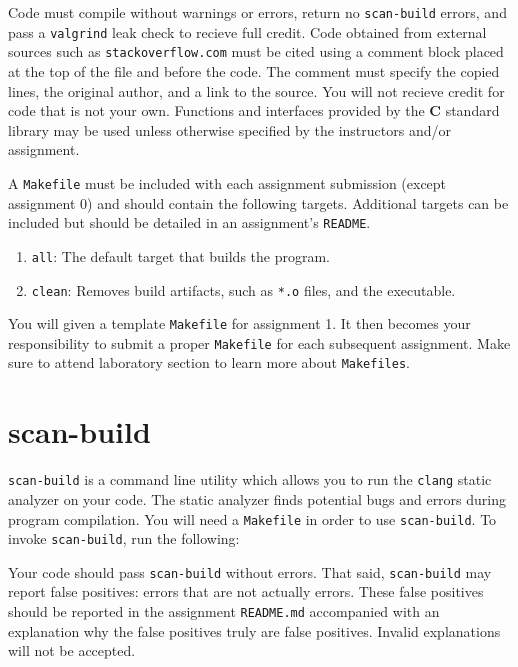 \documentclass[11pt]{article}
\begin{document}
\noindent Code must compile without warnings or errors, return no
\texttt{scan-build} errors, and pass a \texttt{valgrind} leak check to
recieve full credit. Code obtained from external sources such as
\texttt{stackoverflow.com} must be cited using a comment block placed at
the top of the file and before the code. The comment must specify the
copied lines, the original author, and a link to the source. You will
not recieve credit for code that is not your own. Functions and
interfaces provided by the \textbf{C} standard library may be used
unless otherwise specified by the instructors and/or assignment.

A \texttt{Makefile} must be included with each assignment submission
(except assignment 0) and should contain the following targets.
Additional targets can be included but should be detailed in an
assignment's \texttt{README}.
\begin{enumerate}
  \item \texttt{all}: The default target that builds the program.
  \item \texttt{clean}: Removes build artifacts, such as \texttt{*.o} files, and the executable.
\end{enumerate}

You will given a template \texttt{Makefile} for assignment 1. It then
becomes your responsibility to submit a proper \texttt{Makefile} for
each subsequent assignment. Make sure to attend laboratory section to
learn more about \texttt{Makefiles}.

\section{scan-build}

\texttt{scan-build} is a command line utility which allows you to run
the \texttt{clang} static analyzer on your code. The static analyzer
finds potential bugs and errors during program compilation. You will
need a \texttt{Makefile} in order to use \texttt{scan-build}. To invoke
\texttt{scan-build}, run the following:


Your code should pass \texttt{scan-build} without errors. That said,
\texttt{scan-build} may report false positives: errors that are not
actually errors. These false positives should be reported in the
assignment \texttt{README.md} accompanied with an explanation why the
false positives truly are false positives. Invalid explanations will not
be accepted.
\end{document}
